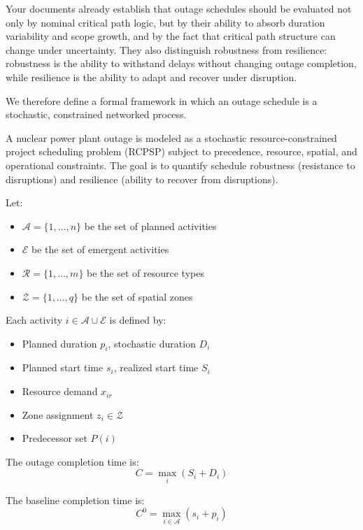 Your documents already establish that outage schedules should be evaluated not only by nominal critical path logic, but by their ability to absorb duration variability and scope growth, and by the fact that critical path structure can change under uncertainty. They also distinguish robustness from resilience: robustness is the ability to withstand delays without changing outage completion, while resilience is the ability to adapt and recover under disruption.

We therefore define a formal framework in which an outage schedule is a stochastic, constrained networked process.

A nuclear power plant outage is modeled as a stochastic resource-constrained project scheduling problem (RCPSP) subject to precedence, resource, spatial, and operational constraints. The goal is to quantify schedule robustness (resistance to disruptions) and resilience (ability to recover from disruptions).

Let:
\begin{itemize}
\item $\mathcal{A} = \{1,\dots,n\}$ be the set of planned activities
\item $\mathcal{E}$ be the set of emergent activities
\item $\mathcal{R} = \{1,\dots,m\}$ be the set of resource types
\item $\mathcal{Z} = \{1,\dots,q\}$ be the set of spatial zones
\end{itemize}

Each activity $i \in \mathcal{A} \cup \mathcal{E}$ is defined by:
\begin{itemize}
\item Planned duration $p_i$, stochastic duration $D_i$
\item Planned start time $s_i$, realized start time $S_i$
\item Resource demand $x_{ir}$
\item Zone assignment $z_i \in \mathcal{Z}$
\item Predecessor set $P(i)$
\end{itemize}

The outage completion time is:
\begin{equation}
C = \max_{i} (S_i + D_i)
\end{equation}

The baseline completion time is:
\begin{equation}
C^0 = \max_{i \in \mathcal{A}} (s_i + p_i)
\end{equation}


